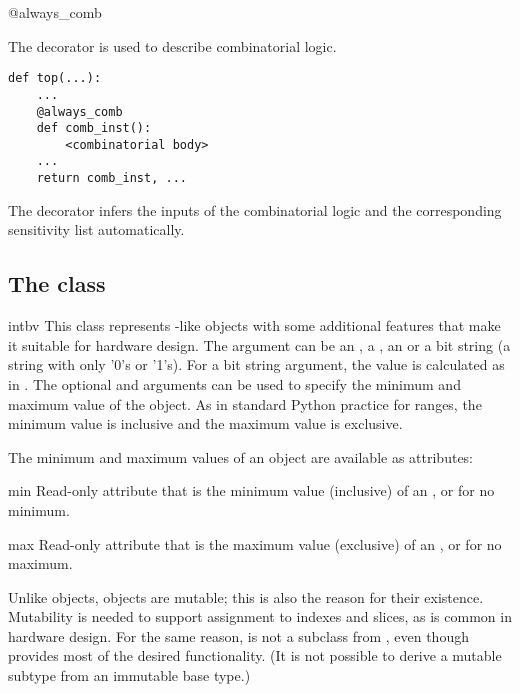 \begin{funcdesc}{@always_comb}{}


The  decorator is used to describe combinatorial
logic.


\begin{verbatim}
def top(...):
    ...
    @always_comb
    def comb_inst():
        <combinatorial body>
    ...
    return comb_inst, ...
\end{verbatim}


The  decorator infers the inputs of the combinatorial
logic and the corresponding sensitivity list automatically.

\end{funcdesc}


\subsection{The  class \label{ref-intbv}}

\begin{classdesc}{intbv}{  
}
This class represents -like objects with some additional
features that make it suitable for hardware design. The 
argument can be an , a , an  or a
bit string (a string with only '0's or '1's). For a bit string
argument, the value is calculated as in .  The optional  and  arguments can be used to
specify the minimum and maximum value of the  object. As
in standard Python practice for ranges, the minimum value is inclusive
and the maximum value is exclusive.
\end{classdesc}

The minimum and maximum values of an  object
are available as attributes:

\begin{memberdesc}[intbv]{min}
Read-only attribute that is the minimum value (inclusive) of an
, or  for no minimum.
\end{memberdesc}
\begin{memberdesc}[intbv]{max}
Read-only attribute that is the maximum value
(exclusive) of an , or  for no 
maximum.
\end{memberdesc}

Unlike  objects,  objects are mutable; this is
also the reason for their existence. Mutability is needed to support
assignment to indexes and slices, as is common in hardware design. For
the same reason,  is not a subclass from ,
even though  provides most of the desired
functionality. (It is not possible to derive a mutable subtype from
an immutable base type.)

